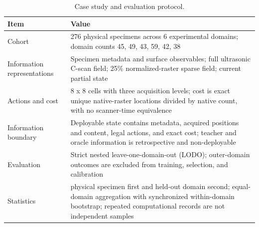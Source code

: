 \begin{table}[t]
\centering
\caption{Case study and evaluation protocol.}
\label{tab:case-protocol}
\small
\setlength{\tabcolsep}{4pt}
\begin{tabularx}{\textwidth}{@{}>{\RaggedRight\arraybackslash}p{}X@{}}
\toprule
Item & Value \\
\midrule
Cohort & 276 physical specimens across 6 experimental domains; domain counts 45, 49, 43, 59, 42, 38 \\
Information representations & Specimen metadata and surface observables; full ultrasonic C-scan field; 25\% normalized-raster sparse field; current partial state \\
Actions and cost & 8 x 8 cells with three acquisition levels; cost is exact unique native-raster locations divided by native count, with no scanner-time equivalence \\
Information boundary & Deployable state contains metadata, acquired positions and content, legal actions, and exact cost; teacher and oracle information is retrospective and non-deployable \\
Evaluation & Strict nested leave-one-domain-out (LODO); outer-domain outcomes are excluded from training, selection, and calibration \\
Statistics & physical specimen first and held-out domain second; equal-domain aggregation with synchronized within-domain bootstrap; repeated computational records are not independent samples \\
\bottomrule
\end{tabularx}
\end{table}
